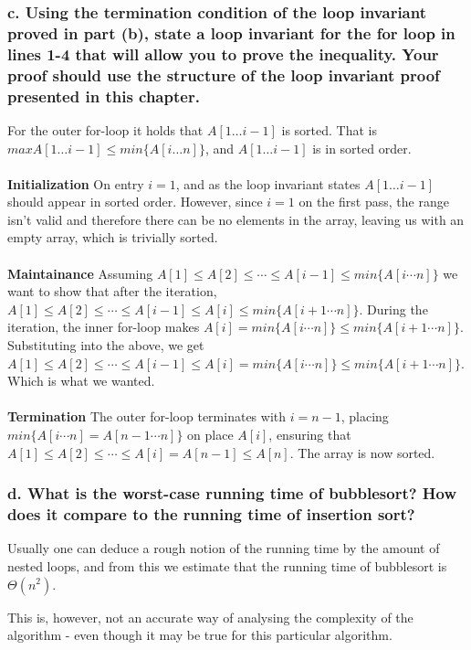 \documentclass[11pt,english]{article}
\begin{document}
\subsubsection*{\large c. \mdseries Using the termination condition of the loop
invariant proved in part (b), state a loop invariant for the \textbf{for} loop
in lines 1-4 that will allow you to prove the inequality. Your proof should
use the structure of the loop invariant proof presented in this chapter.}
For the outer for-loop it holds that $A[1 \dots i-1]$ is sorted. That is
$max{A[1 \dots i - 1]} \leq min\{A[i \dots n]\}$, and $A[1 \dots i-1]$ is
in sorted order.
\\\\
\textbf{Initialization} \mdseries On entry $i = 1$, and as the loop invariant
states $A[1 \dots i - 1]$ should appear in sorted order. However, since
$i = 1$ on the first pass, the range isn't valid and therefore there can be
no elements in the array, leaving us with an empty array, which is trivially
sorted.
\\\\
\textbf{Maintainance} \mdseries Assuming $ A[1] \leq A[2] \leq \cdots \leq 
A[i-1] \leq min\{ A[i \cdots n] \}$ we want to show that after the iteration,
$ A[1] \leq A[2] \leq \cdots \leq A[i-1] \leq A[i] \leq min\{ A[i+1 \cdots n]
\}$. During the iteration, the inner for-loop makes $A[i] = min\{ A[i \cdots 
n] \} \leq min\{ A[i+1 \cdots n] \}$. Substituting into the above, we get $ 
A[1] \leq A[2] \leq \cdots \leq A[i-1] \leq A[i] = min\{ A[i \cdots n] \} 
\leq min\{ A[i+1 \cdots n] \}$. Which is what we wanted.
\\\\
\textbf{Termination} \mdseries The outer for-loop terminates with $i = n-1$,
placing $min\{A[i \cdots n] = A[n-1 \cdots n]\}$ on place $A[i]$, ensuring 
that $ A[1] \leq A[2] \leq \cdots \leq A[i] = A[n-1] \leq A[n]$. The array 
is now sorted.

\subsubsection*{\large d. \mdseries What is the worst-case running time of
bubblesort? How does it compare to the running time of insertion sort?}
Usually one can deduce a rough notion of the running time by the amount of
nested loops, and from this we estimate that the running time of bubblesort
is $\Theta(n^2)$.

This is, however, not an accurate way of analysing the complexity of the
algorithm - even though it may be true for this particular algorithm.
\end{document}

